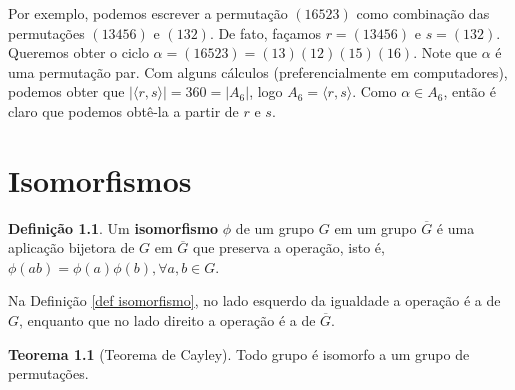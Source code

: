 \documentclass[a4paper,portuguese,11pt,twoside, leqno]{book}
\theoremstyle{definition}
\newtheorem{theorem}{Teorema}[section]
\newtheorem*{definition}{Definição}
\begin{document}
	\par\vspace{0.3cm} Por exemplo, podemos escrever a permutação $(16523)$ como combinação das permutações $(13456)$ e $(132)$. De fato, façamos $r = (13456)$ e $s = (132)$. Queremos obter o ciclo $\alpha = (16523) = (13)(12)(15)(16)$. Note que $\alpha$ é uma permutação par. Com alguns cálculos (preferencialmente em computadores), podemos obter que $|\langle r,s \rangle| = 360 = |A_6|$, logo $A_6 = \langle r,s \rangle$. Como $\alpha\in A_6$, então é claro que podemos obtê-la a partir de $r$ e $s$.
	
	\chapter{Isomorfismos}\label{capitulo isomorfismos}
	
	\begin{definition}
		\label{def isomorfismo}
		Um \textbf{isomorfismo} $\phi$ de um grupo $G$ em um grupo $\overline{G}$ é uma aplicação bijetora de $G$ em $\overline{G}$ que preserva a operação, isto é, $\phi(ab) = \phi(a)\phi(b),\forall a,b\in G$.
	\end{definition}
	\par\vspace{0.3cm} Na Definição \eqref{def isomorfismo}, no lado esquerdo da igualdade a operação é a de $G$, enquanto que no lado direito a operação é a de $\overline{G}$.
	
	\begin{theorem}[Teorema de Cayley]
		\label{Cayley}
		Todo grupo é isomorfo a um grupo de permutações.
	\end{theorem}
	
\end{document}
